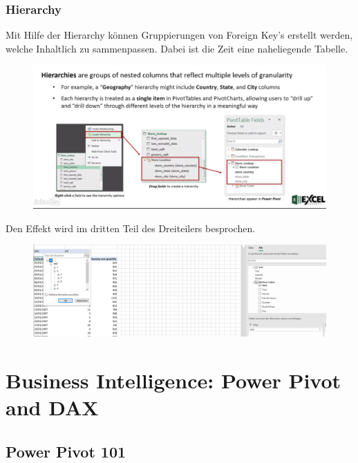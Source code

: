 \subsubsection{Hierarchy}
Mit Hilfe der Hierarchy können Gruppierungen von Foreign Key's erstellt werden, welche Inhaltlich zu sammenpassen. Dabei ist die Zeit eine naheliegende Tabelle.
\begin{figure}[H]
	\centering
	\includegraphics[scale = 0.3]{attachment/chapter_1/screenshot071}
	\caption{}
	\label{fig:screenshot071}
\end{figure}
Den Effekt wird im dritten Teil des Dreiteilers besprochen.
\begin{figure}[H]
	\centering
	\includegraphics[scale = 0.3]{attachment/chapter_1/screenshot072}
	\caption{}
	\label{fig:screenshot072}
\end{figure}
\section{Business Intelligence: Power Pivot and DAX}
\subsection{Power Pivot 101}
